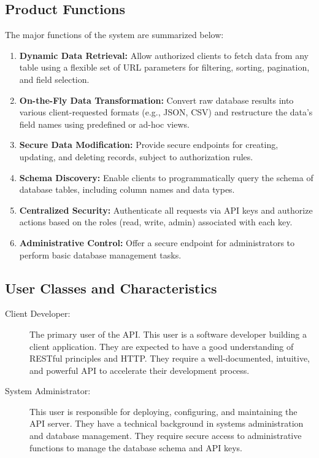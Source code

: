 \documentclass[12pt, a4paper]{report}
\begin{document}
\subsection{Product Functions}
The major functions of the system are summarized below:
\begin{enumerate}
    \item \textbf{Dynamic Data Retrieval:} Allow authorized clients to fetch data from any table using a flexible set of URL parameters for filtering, sorting, pagination, and field selection.
    \item \textbf{On-the-Fly Data Transformation:} Convert raw database results into various client-requested formats (e.g., JSON, CSV) and restructure the data's field names using predefined or ad-hoc views.
    \item \textbf{Secure Data Modification:} Provide secure endpoints for creating, updating, and deleting records, subject to authorization rules.
    \item \textbf{Schema Discovery:} Enable clients to programmatically query the schema of database tables, including column names and data types.
    \item \textbf{Centralized Security:} Authenticate all requests via API keys and authorize actions based on the roles (read, write, admin) associated with each key.
    \item \textbf{Administrative Control:} Offer a secure endpoint for administrators to perform basic database management tasks.
\end{enumerate}

\subsection{User Classes and Characteristics}
\begin{description}
    \item[Client Developer:] The primary user of the API. This user is a software developer building a client application. They are expected to have a good understanding of RESTful principles and HTTP. They require a well-documented, intuitive, and powerful API to accelerate their development process.
    \item[System Administrator:] This user is responsible for deploying, configuring, and maintaining the API server. They have a technical background in systems administration and database management. They require secure access to administrative functions to manage the database schema and API keys.
\end{description}
\end{document}
